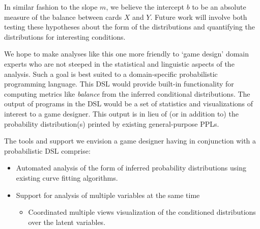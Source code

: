 In similar fashion to the slope $m$, we believe the intercept $b$ to be
an absolute measure of the balance between cards $X$ and $Y$.
Future work will involve both testing these hypotheses about
the form of the distributions and quantifying the distributions
for interesting conditions.

We hope to make analyses like this one more friendly to `game design'
domain experts who are not steeped in the statistical and
linguistic aspects of the analysis. Such a goal is best suited to
a domain-specific probabilistic programming language. This DSL
would provide built-in functionality for computing metrics like
\emph{balance} from the inferred conditional distributions.
The output of programs in the DSL would be a set of statistics
and visualizations of interest to a game designer. This output
is in lieu of (or in addition to) the probability distribution(s)
printed by existing general-purpose PPLs.

The tools and support we envision a game designer having
in conjunction with a probabilistic DSL comprise:

\begin{itemize}
\item Automated analysis of the form of inferred probability distributions
      using existing curve fitting algorithms.
\item Support for analysis of multiple variables at the same time
      \begin{itemize}
      \item Coordinated multiple views visualization of the conditioned
            distributions over the latent variables.
      \end{itemize}
\end{itemize}



